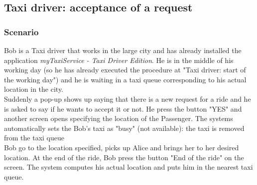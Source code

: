 \pagebreak
\subsection{Taxi driver: acceptance of a request}
\subsubsection{Scenario}
Bob is a Taxi driver that works in the large city and has already installed the application \textit{myTaxiService - Taxi Driver Edition}.
He is in the middle of his working day (so he has already executed the procedure at "Taxi driver: start of the working day") and he is waiting in a taxi queue corresponding to his actual location in the city.\\
Suddenly a pop-up shows up saying that there is a new request for a ride and he is asked to say if he wants to accept it or not.
He press the button "YES" and another screen opens specifying the location of the Passenger. The systems automatically sets the Bob's taxi as "busy" (not available): the taxi is removed from the taxi queue\\
Bob go to the location specified, picks up Alice and brings her to her desired location. At the end of the ride, Bob press the button "End of the ride" on the screen. The system computes his actual location and puts him in the nearest taxi queue.

